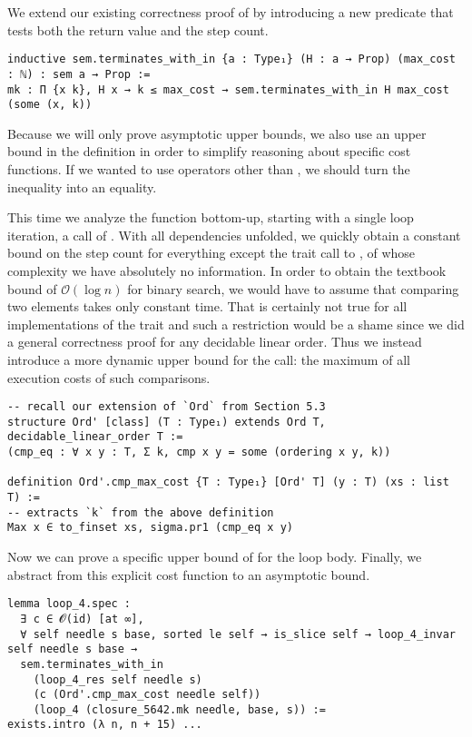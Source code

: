 We extend our existing correctness proof of  by introducing
a new predicate that tests both the return value and the step count.

\begin{verbatim}
inductive sem.terminates_with_in {a : Type₁} (H : a → Prop) (max_cost : ℕ) : sem a → Prop :=
mk : Π {x k}, H x → k ≤ max_cost → sem.terminates_with_in H max_cost (some (x, k))
\end{verbatim}

Because we will only prove asymptotic upper bounds, we also use an upper bound
in the definition in order to simplify reasoning about specific cost functions.
If we wanted to use operators other than , we should turn the inequality
into an equality.

This time we analyze the function bottom-up, starting with a single loop iteration, \ie
a call of . With all dependencies unfolded, we quickly obtain a
constant bound on the step count for everything except the trait call to
, of whose complexity we have absolutely no information. In order
to obtain the textbook bound of $\mathcal{O}(\log n)$ for binary search, we would
have to assume that comparing two elements takes only constant time. That is
certainly not true for all implementations of the trait and such a
restriction would be a shame since we did a general correctness proof for any
decidable linear order. Thus we instead introduce a more dynamic upper bound for
the call: the maximum of all execution costs of such comparisons.

\begin{verbatim}
-- recall our extension of `Ord` from Section 5.3
structure Ord' [class] (T : Type₁) extends Ord T, decidable_linear_order T :=
(cmp_eq : ∀ x y : T, Σ k, cmp x y = some (ordering x y, k))

definition Ord'.cmp_max_cost {T : Type₁} [Ord' T] (y : T) (xs : list T) :=
-- extracts `k` from the above definition
Max x ∈ to_finset xs, sigma.pr1 (cmp_eq x y)
\end{verbatim}

Now we can prove a specific upper bound of  for the loop body. Finally, we abstract from this explicit cost function
to an asymptotic bound.

\begin{verbatim}
lemma loop_4.spec :
  ∃ c ∈ 𝓞(id) [at ∞],
  ∀ self needle s base, sorted le self → is_slice self → loop_4_invar self needle s base →
  sem.terminates_with_in
    (loop_4_res self needle s)
    (c (Ord'.cmp_max_cost needle self))
    (loop_4 (closure_5642.mk needle, base, s)) :=
exists.intro (λ n, n + 15) ...
\end{verbatim}

